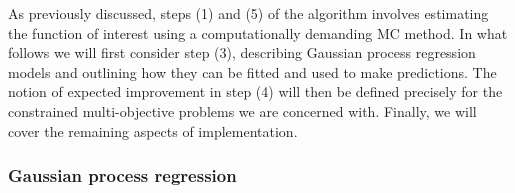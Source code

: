 \documentclass{article} %
\begin{document}
As previously discussed, steps (1) and (5) of the algorithm involves estimating the function of interest using a computationally demanding MC method. In what follows we will first consider step (3), describing Gaussian process regression models and outlining how they can be fitted and used to make predictions. The notion of expected improvement in step (4) will then be defined precisely for the constrained multi-objective problems we are concerned with. Finally, we will cover the remaining aspects of implementation.



\subsubsection{Gaussian process regression}\label{sec:GP}
\end{document}
